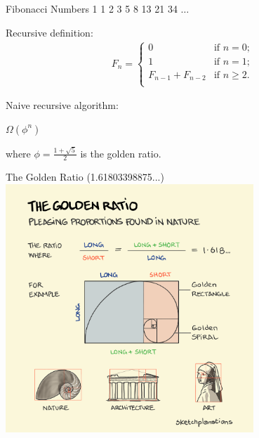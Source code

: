 \documentclass{beamer}
\begin{document}
\begin{frame}{Fibonacci Numbers}
     \hspace{2mm} 1 \hspace{2mm} 1 \hspace{2mm} 2 \hspace{2mm} 3 \hspace{2mm} 5 \hspace{2mm} 8 \hspace{2mm} 13 \hspace{2mm} 21 \hspace{2mm} 34 \hspace{2mm} $\ldots$
    \begin{alertblock}{Recursive definition:}
        \begin{align*}
            F_n =
                \begin{cases}
                    0 & \text{if $n = 0$;} \\
                    1 & \text{if $n = 1$;} \\
                    F_{n - 1} + F_{n - 2} & \text{if $n \geq 2$.}\\
                \end{cases}
        \end{align*}
    \end{alertblock}
    \begin{alertblock}{Naive recursive algorithm:} \pause
        \begin{center}
            \LARGE
            $\Omega(\phi^n)$
        \end{center}
    \end{alertblock} \pause
    where $\phi = \frac{1 + \sqrt{5}}{2}$ is the golden ratio.
\end{frame}

\begin{frame}{The Golden Ratio (1.61803398875...)}
    \centering
    \includegraphics[width=0.7\textwidth]{figures/golden_ratio}
\end{frame}
\end{document}

